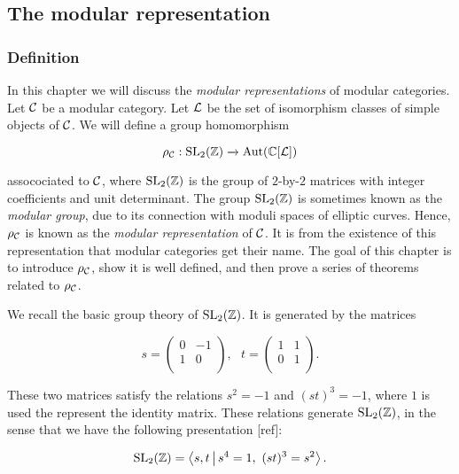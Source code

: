\subsection{The modular representation}

\subsubsection{Definition}

In this chapter we will discuss the {\em modular representations} of modular categories. Let ${\mathcal C}$ be a modular category. Let ${\mathcal L}$ be the set of isomorphism classes of simple objects of ${\mathcal C}$. We will define a group homomorphism

$$\rho_{{\mathcal C}}:\operatorname{SL}_2({\mathbb Z})\xrightarrow{}\operatorname{Aut}({\mathbb C}[{\mathcal L}])$$

assocociated to ${\mathcal C}$, where $\operatorname{SL}_2({\mathbb Z})$ is the group of $2$-by-$2$ matrices with integer coefficients and unit determinant. The group $\operatorname{SL}_2({\mathbb Z})$ is sometimes known as the {\em modular group}, due to its connection with moduli spaces of elliptic curves. Hence, $\rho_{{\mathcal C}}$ is known as the {\em modular representation} of ${\mathcal C}$. It is from the existence of this representation that modular categories get their name. The goal of this chapter is to introduce $\rho_{{\mathcal C}}$, show it is well defined, and then prove a series of theorems related to $\rho_{{\mathcal C}}$.

\begin{rem}\label{SL2Z-group-theory}
We recall the basic group theory of $\operatorname{SL}_2({\mathbb Z})$. It is generated by the matrices

$$
s=
\begin{pmatrix}
0 & -1 \\
1 & 0 \\
\end{pmatrix},
\,\,\,\,
t=
\begin{pmatrix}
1 & 1 \\
0 & 1 \\
\end{pmatrix}.
$$

These two matrices satisfy the relations $s^2=-1$ and $(st)^3=-1$, where $1$ is used the represent the identity matrix. These relations generate $\operatorname{SL}_2({\mathbb Z})$, in the sense that we have the following presentation [ref]:

\begin{equation}
\operatorname{SL}_2({\mathbb Z})=\Braket{s,t | s^4=1,\,\, (st)^3=s^2}.
\end{equation}
\end{rem}

